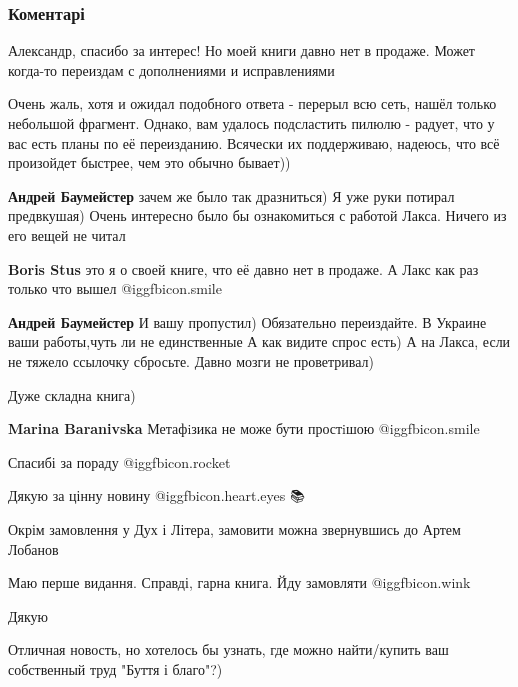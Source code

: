  
 
 
 
 
\subsubsection{Коментарі}

\begin{itemize} %
Александр, спасибо за интерес! Но моей книги давно нет в продаже. Может когда-то переиздам с дополнениями и исправлениями

\begin{itemize} %

Очень жаль, хотя и ожидал подобного ответа - перерыл всю сеть, нашёл только
небольшой фрагмент. Однако, вам удалось подсластить пилюлю - радует, что у вас
есть планы по её переизданию. Всячески их поддерживаю, надеюсь, что всё
произойдет быстрее, чем это обычно бывает))

\textbf{Андрей Баумейстер} зачем же было так дразниться)
Я уже руки потирал предвкушая)
Очень интересно было бы ознакомиться с работой Лакса.
Ничего из его вещей не читал

\textbf{Boris Stus} это я о своей книге, что её давно нет в продаже. А Лакс как раз только что вышел  @igg{fbicon.smile} 

\textbf{Андрей Баумейстер} И вашу пропустил)
Обязательно переиздайте.
В Украине ваши работы,чуть ли не единственные
А как видите спрос есть)
А на Лакса, если не тяжело ссылочку сбросьте. Давно мозги не проветривал)
\end{itemize} %

Дуже складна книга)

\textbf{Marina Baranivska} Метафiзика не може бути простiшою  @igg{fbicon.smile} 

Спасибі за пораду @igg{fbicon.rocket} 

Дякую за цінну новину @igg{fbicon.heart.eyes} 📚

Окрім замовлення у Дух і Літера, замовити можна звернувшись до Артем Лобанов

Маю перше видання. Справді, гарна книга. Йду замовляти @igg{fbicon.wink} 

Дякую

Отличная новость, но хотелось бы узнать, где можно найти/купить ваш собственный труд "Буття і благо"?)

\end{itemize} %
